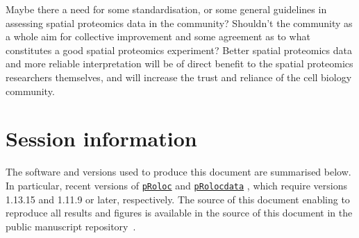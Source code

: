 \documentclass[12pt]{article}\usepackage[]{graphicx}\usepackage[]{color}
\newcommand{\Rpackage}[1]{\texttt{#1}}
\newcommand\Biocpkg[1]{%
  {\href{http://bioconductor.org/packages/#1}%
    {\Rpackage{#1}}}}
\newcommand\Biocexptpkg[1]{\Biocpkg{#1}}
\begin{document}
Maybe there a need for some standardisation, or some general
guidelines in assessing spatial proteomics data in the community?
Shouldn't the community as a whole aim for collective improvement and
some agreement as to what constitutes a good spatial proteomics experiment?
Better spatial proteomics data and more reliable interpretation will
be of direct benefit to the spatial proteomics researchers themselves,
and will increase the trust and reliance of the cell biology
community.

\section{Session information}

The software and versions used to produce this document are summarised
below. In particular, recent versions of \Biocpkg{pRoloc} and
\Biocexptpkg{pRolocdata} \citep{Gatto:2014a}, which require versions
1.13.15 and 1.11.9 or later, respectively. The source of this document
enabling to reproduce all results and figures is available in the
source of this document in the public manuscript
repository~\cite{qseprepo}.
\end{document}

